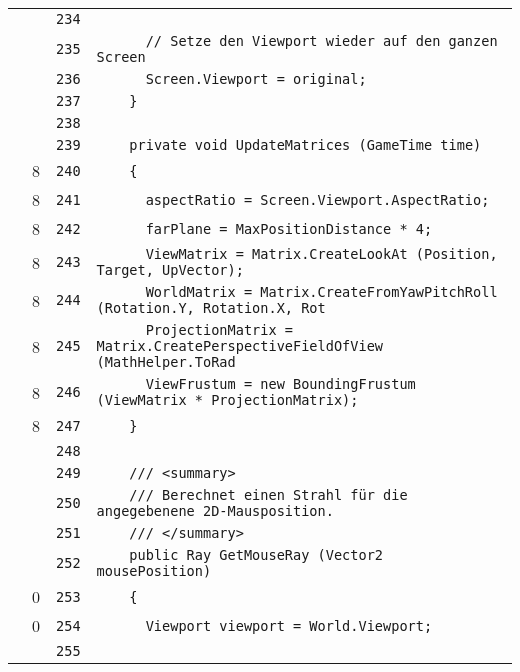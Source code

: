 \documentclass[a4paper,10pt]{article}
\begin{document}
\begin{longtable}[l]{lrrl}
\cellcolor{gray} &  & \verb~234~ & \verb~~\\
\cellcolor{gray} &  & \verb~235~ & \verb~      // Setze den Viewport wieder auf den ganzen Screen~\\
\cellcolor{gray} &  & \verb~236~ & \verb~      Screen.Viewport = original;~\\
\cellcolor{gray} &  & \verb~237~ & \verb~    }~\\
\cellcolor{gray} &  & \verb~238~ & \verb~~\\
\cellcolor{gray} &  & \verb~239~ & \verb~    private void UpdateMatrices (GameTime time)~\\
\cellcolor{green} & 8 & \verb~240~ & \verb~    {~\\
\cellcolor{green} & 8 & \verb~241~ & \verb~      aspectRatio = Screen.Viewport.AspectRatio;~\\
\cellcolor{green} & 8 & \verb~242~ & \verb~      farPlane = MaxPositionDistance * 4;~\\
\cellcolor{green} & 8 & \verb~243~ & \verb~      ViewMatrix = Matrix.CreateLookAt (Position, Target, UpVector);~\\
\cellcolor{green} & 8 & \verb~244~ & \verb~      WorldMatrix = Matrix.CreateFromYawPitchRoll (Rotation.Y, Rotation.X, Rot~\\
\cellcolor{green} & 8 & \verb~245~ & \verb~      ProjectionMatrix = Matrix.CreatePerspectiveFieldOfView (MathHelper.ToRad~\\
\cellcolor{green} & 8 & \verb~246~ & \verb~      ViewFrustum = new BoundingFrustum (ViewMatrix * ProjectionMatrix);~\\
\cellcolor{green} & 8 & \verb~247~ & \verb~    }~\\
\cellcolor{gray} &  & \verb~248~ & \verb~~\\
\cellcolor{gray} &  & \verb~249~ & \verb~    /// <summary>~\\
\cellcolor{gray} &  & \verb~250~ & \verb~    /// Berechnet einen Strahl für die angegebenene 2D-Mausposition.~\\
\cellcolor{gray} &  & \verb~251~ & \verb~    /// </summary>~\\
\cellcolor{gray} &  & \verb~252~ & \verb~    public Ray GetMouseRay (Vector2 mousePosition)~\\
\cellcolor{red} & 0 & \verb~253~ & \verb~    {~\\
\cellcolor{red} & 0 & \verb~254~ & \verb~      Viewport viewport = World.Viewport;~\\
\cellcolor{gray} &  & \verb~255~ & \verb~~\\

\end{longtable}
\end{document}
